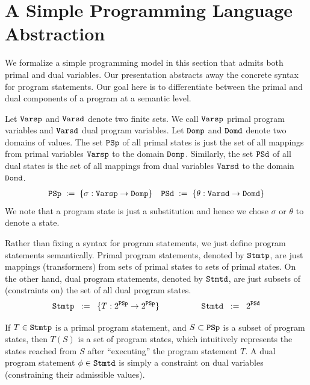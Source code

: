 \documentclass[preprint]{sig-alternate-05-2015}
\def\Vp{{\tt{Varsp}}}
\def\Vd{{\tt{Varsd}}}
\def\Stmtp{{\tt{Stmtp}}}
\def\Stmtd{{\tt{Stmtd}}}
\def\psp{{\tt{PSp}}}
\def\psd{{\tt{PSd}}}
\def\ds{{\mathit{\theta}}}   %
\def\domp{{\tt{Domp}}}
\def\domd{{\tt{Domd}}}
\begin{document}
\section{A Simple Programming Language Abstraction}
\label{sec:language}

We formalize a simple programming model in this section that
admits both primal and dual variables.
Our presentation abstracts away the concrete syntax for program statements.  
Our goal here is to differentiate between the primal and dual components of 
a program at a semantic level.

Let $\Vp$ and $\Vd$ denote two finite sets.
We call $\Vp$ primal program variables and 
$\Vd$ dual program variables.
Let $\domp$ and $\domd$ denote two domains of values.
The set $\psp$ of all primal states is
just the set of all mappings from primal 
variables $\Vp$ to the domain $\domp$.
Similarly, the set $\psd$ of all dual states is
the set of all mappings from dual 
variables $\Vd$ to the domain $\domd$.
\begin{eqnarray*}
  \psp \; := \;
  \{ \sigma: \Vp \rightarrow \domp \}
&  &
  \psd \; := \;
  \{ \ds: \Vd \rightarrow \domd \}
\end{eqnarray*}
We note that
a program state is just a substitution and hence
we chose $\sigma$ or $\ds$ to denote a state.

Rather than fixing a syntax for program statements,
we just define program statements semantically.
Primal program statements, denoted by $\Stmtp$,
are just mappings (transformers) from sets of primal states to 
sets of primal states.
On the other hand, dual program statements, denoted by $\Stmtd$,
are just subsets of (constraints on) the set of all dual program states.
\begin{eqnarray*}
 \Stmtp \;\; := \;\; \{ T: 2^\psp \rightarrow 2^\psp \}
& \qquad\qquad &
 \Stmtd \;\; := \;\; 2^{\psd}
\end{eqnarray*}

If $T\in\Stmtp$ is a primal program statement,
and $S\subset \psp$ is a subset of program states,
then $T(S)$ is a set of program states, which
intuitively represents the states reached from $S$
after ``executing'' the program statement $T$.
A dual program statement $\phi\in\Stmtd$ is simply a constraint
on dual variables (constraining their admissible values).
\end{document}
